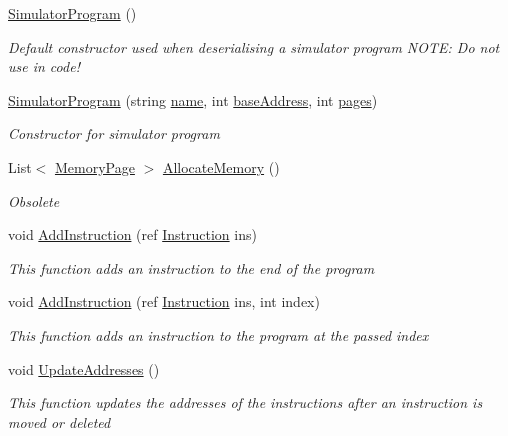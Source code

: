 \begin{DoxyCompactItemize}
\item 
\hyperlink{class_c_p_u___o_s___simulator_1_1_c_p_u_1_1_simulator_program_a92873858cd0a0d7e506f5718788a9e5e}{Simulator\+Program} ()
\begin{DoxyCompactList}\small\item\em Default constructor used when deserialising a simulator program N\+O\+T\+E\+: Do not use in code! \end{DoxyCompactList}\item 
\hyperlink{class_c_p_u___o_s___simulator_1_1_c_p_u_1_1_simulator_program_aa0d38ce5b657952b2dddc6bdfc009421}{Simulator\+Program} (string \hyperlink{class_c_p_u___o_s___simulator_1_1_c_p_u_1_1_simulator_program_ad4797b5d81ceb01cd4207a97b7af36c5}{name}, int \hyperlink{class_c_p_u___o_s___simulator_1_1_c_p_u_1_1_simulator_program_a7cca2ee3950e37d25f4f68d76d1241c4}{base\+Address}, int \hyperlink{class_c_p_u___o_s___simulator_1_1_c_p_u_1_1_simulator_program_ad86f4c2caa37cf36b8ab276ebe2a39bb}{pages})
\begin{DoxyCompactList}\small\item\em Constructor for simulator program \end{DoxyCompactList}\item 
List$<$ \hyperlink{class_c_p_u___o_s___simulator_1_1_memory_1_1_memory_page}{Memory\+Page} $>$ \hyperlink{class_c_p_u___o_s___simulator_1_1_c_p_u_1_1_simulator_program_a8f56bf19c4defa3f61c554e635f4904a}{Allocate\+Memory} ()
\begin{DoxyCompactList}\small\item\em Obsolete \end{DoxyCompactList}\item 
void \hyperlink{class_c_p_u___o_s___simulator_1_1_c_p_u_1_1_simulator_program_a6b6df3400e406b1dc6de3787f1a8fc61}{Add\+Instruction} (ref \hyperlink{class_c_p_u___o_s___simulator_1_1_c_p_u_1_1_instruction}{Instruction} ins)
\begin{DoxyCompactList}\small\item\em This function adds an instruction to the end of the program \end{DoxyCompactList}\item 
void \hyperlink{class_c_p_u___o_s___simulator_1_1_c_p_u_1_1_simulator_program_a1142bf081f4173d0276504db3d232968}{Add\+Instruction} (ref \hyperlink{class_c_p_u___o_s___simulator_1_1_c_p_u_1_1_instruction}{Instruction} ins, int index)
\begin{DoxyCompactList}\small\item\em This function adds an instruction to the program at the passed index \end{DoxyCompactList}\item 
void \hyperlink{class_c_p_u___o_s___simulator_1_1_c_p_u_1_1_simulator_program_a4f7e933d4f3ca318d68471d465c6b31c}{Update\+Addresses} ()
\begin{DoxyCompactList}\small\item\em This function updates the addresses of the instructions after an instruction is moved or deleted \end{DoxyCompactList}\end{DoxyCompactItemize}
